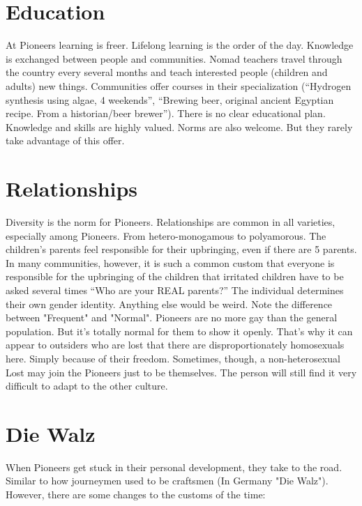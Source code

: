 \section{Education}
At Pioneers learning is freer. Lifelong learning is the order of the day. Knowledge is exchanged between people and communities. Nomad teachers travel through the country every several months and teach interested people (children and adults) new things. Communities offer courses in their specialization (“Hydrogen synthesis using algae, 4 weekends”, “Brewing beer, original ancient Egyptian recipe. From a historian/beer brewer”). There is no clear educational plan. Knowledge and skills are highly valued. Norms are also welcome. But they rarely take advantage of this offer.

\section{Relationships}
Diversity is the norm for Pioneers.
Relationships are common in all varieties, especially among Pioneers. From hetero-monogamous to polyamorous. The children's parents feel responsible for their upbringing, even if there are 5 parents. In many communities, however, it is such a common custom that everyone is responsible for the upbringing of the children that irritated children have to be asked several times “Who are your REAL parents?” The individual determines their own gender identity. Anything else
would be weird.
Note the difference between "Frequent" and "Normal". Pioneers are no more gay than the general population. But it's totally normal for them to show it openly. That's why it can appear to outsiders who are lost that there are disproportionately homosexuals here. Simply because of their freedom.
Sometimes, though, a non-heterosexual Lost may join the Pioneers just to be themselves. The person will still find it very difficult to adapt to the other culture.

\section{Die Walz}
When Pioneers get stuck in their personal development, they take to the road. Similar to how journeymen used to be craftsmen (In Germany "Die Walz"). However, there are some changes to the customs of the time:

